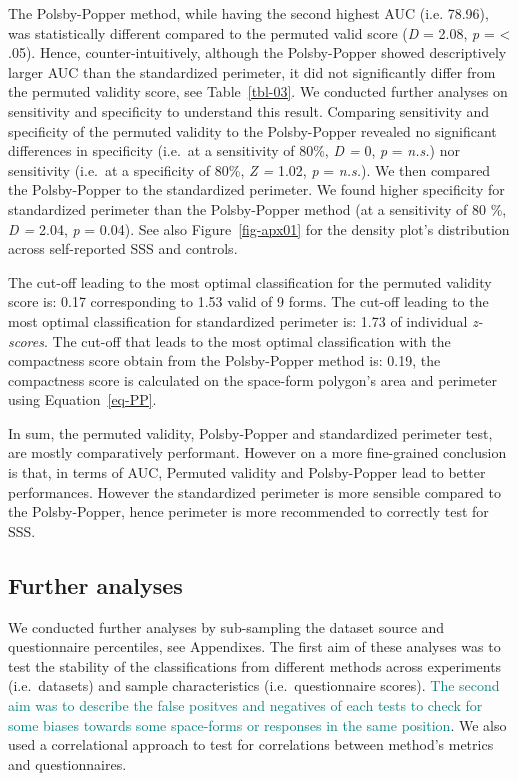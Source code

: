 \documentclass[
  man,
  floatsintext,
  longtable,
  a4paper,
  nolmodern,
  notxfonts,
  notimes,
  colorlinks=true,linkcolor=blue,citecolor=blue,urlcolor=blue]{apa7}
\begin{document}
The Polsby-Popper method, while having the second highest AUC (i.e.
78.96), was statistically different compared to the permuted valid score
(\emph{D} = 2.08, \emph{p} = \textless{} .05). Hence,
counter-intuitively, although the Polsby-Popper showed descriptively
larger AUC than the standardized perimeter, it did not significantly
differ from the permuted validity score, see Table~\ref{tbl-03}. We
conducted further analyses on sensitivity and specificity to understand
this result. Comparing sensitivity and specificity of the permuted
validity to the Polsby-Popper revealed no significant differences in
specificity (i.e.~at a sensitivity of 80\%, \emph{D =} 0, \emph{p} =
\emph{n.s.}) nor sensitivity (i.e.~at a specificity of 80\%, \emph{Z =}
1.02, \emph{p} = \emph{n.s.}). We then compared the Polsby-Popper to the
standardized perimeter. We found higher specificity for standardized
perimeter than the Polsby-Popper method (at a sensitivity of 80 \%,
\emph{D =} 2.04, \emph{p} = 0.04). See also Figure~\ref{fig-apx01} for
the density plot's distribution across self-reported SSS and controls.

The cut-off leading to the most optimal classification for the permuted
validity score is: 0.17 corresponding to 1.53 valid of 9 forms. The
cut-off leading to the most optimal classification for standardized
perimeter is: 1.73 of individual \emph{z-scores}. The cut-off that leads
to the most optimal classification with the compactness score obtain
from the Polsby-Popper method is: 0.19, the compactness score is
calculated on the space-form polygon's area and perimeter using
Equation~\ref{eq-PP}.

In sum, the permuted validity, Polsby-Popper and standardized perimeter
test, are mostly comparatively performant. However on a more
fine-grained conclusion is that, in terms of AUC, Permuted validity and
Polsby-Popper lead to better performances. However the standardized
perimeter is more sensible compared to the Polsby-Popper, hence
perimeter is more recommended to correctly test for SSS.

\subsection{Further analyses}\label{further-analyses}

We conducted further analyses by sub-sampling the dataset source and
questionnaire percentiles, see Appendixes. The first aim of these
analyses was to test the stability of the classifications from different
methods across experiments (i.e.~datasets) and sample characteristics
(i.e.~questionnaire scores).
\textcolor{teal}{The second aim was to describe the false positves and negatives of each tests to check for some biases towards some space-forms or responses in the same position}.
We also used a correlational approach to test for correlations between
method's metrics and questionnaires.
\end{document}
